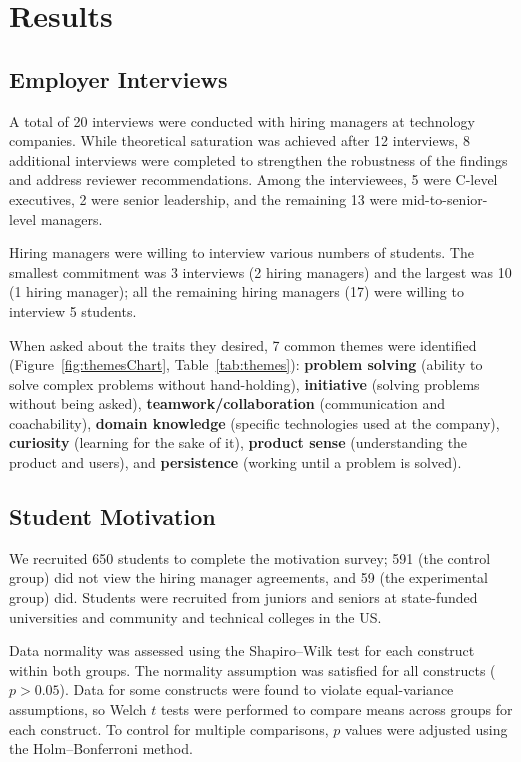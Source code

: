 \section{Results}
\subsection{Employer Interviews}




A total of 20 interviews were conducted with hiring managers at technology companies. While theoretical saturation was achieved after 12 interviews, 8 additional interviews were completed to strengthen the robustness of the findings and address reviewer recommendations. Among the interviewees, 5 were C-level executives, 2 were senior leadership, and the remaining 13 were mid-to-senior-level managers.

Hiring managers were willing to interview various numbers of students. The smallest commitment was 3 interviews (2 hiring managers) and the largest was 10 (1 hiring manager); all the remaining hiring managers (17) were willing to interview 5 students.

When asked about the traits they desired, 7 common themes were identified (Figure~\ref{fig:themesChart}, Table~\ref{tab:themes}):  \textbf{problem solving} (ability to solve complex problems without hand-holding), \textbf{initiative} (solving problems without being asked), \textbf{teamwork/collaboration} (communication and coachability), \textbf{domain knowledge} (specific technologies used at the company), \textbf{curiosity} (learning for the sake of it), \textbf{product sense} (understanding the product and users), and \textbf{persistence} (working until a problem is solved).

\subsection{Student Motivation}

We recruited 650 students to complete the motivation survey; 591 (the control group) did not view the hiring manager agreements, and 59 (the experimental group) did. Students were recruited from juniors and seniors at state-funded universities and community and technical colleges in the US.

Data normality was assessed using the Shapiro--Wilk test for each construct within both groups. The normality assumption was satisfied for all constructs ($p > 0.05$). Data for some constructs were found to violate equal-variance assumptions, so Welch $t$ tests were performed to compare means across groups for each construct. To control for multiple comparisons, $p$ values were adjusted using the Holm--Bonferroni method.

